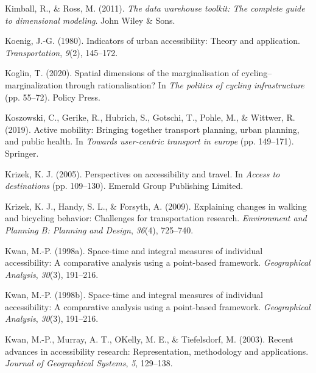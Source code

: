 \documentclass[
11pt, %
oneside, %
english, %
singlespacing, %
]{macthesis} %
\newlength{\cslhangindent}
\newenvironment{CSLReferences}[2] %
 {%
  \setlength{\parindent}{0pt}
  \ifodd #1 \everypar{\setlength{\hangindent}{\cslhangindent}}\ignorespaces\fi
  \ifnum #2 > 0
  \setlength{\parskip}{#2\baselineskip}
  \fi
 }%
 {}
\begin{document}
\begin{CSLReferences}{1}{0}
\leavevmode{}%
Kimball, R., \& Ross, M. (2011). \emph{The data warehouse toolkit: The complete guide to dimensional modeling}. John Wiley \& Sons.

\leavevmode{}%
Koenig, J.-G. (1980). Indicators of urban accessibility: Theory and application. \emph{Transportation}, \emph{9}(2), 145--172.

\leavevmode{}%
Koglin, T. (2020). Spatial dimensions of the marginalisation of cycling--marginalization through rationalisation? In \emph{The politics of cycling infrastructure} (pp. 55--72). Policy Press.

\leavevmode{}%
Koszowski, C., Gerike, R., Hubrich, S., Gotschi, T., Pohle, M., \& Wittwer, R. (2019). Active mobility: Bringing together transport planning, urban planning, and public health. In \emph{Towards user-centric transport in europe} (pp. 149--171). Springer.

\leavevmode{}%
Krizek, K. J. (2005). Perspectives on accessibility and travel. In \emph{Access to destinations} (pp. 109--130). Emerald Group Publishing Limited.

\leavevmode{}%
Krizek, K. J., Handy, S. L., \& Forsyth, A. (2009). Explaining changes in walking and bicycling behavior: Challenges for transportation research. \emph{Environment and Planning B: Planning and Design}, \emph{36}(4), 725--740.

\leavevmode{}%
Kwan, M.-P. (1998a). Space-time and integral measures of individual accessibility: A comparative analysis using a point-based framework. \emph{Geographical Analysis}, \emph{30}(3), 191--216.

\leavevmode{}%
Kwan, M.-P. (1998b). Space-time and integral measures of individual accessibility: A comparative analysis using a point-based framework. \emph{Geographical Analysis}, \emph{30}(3), 191--216.

\leavevmode{}%
Kwan, M.-P., Murray, A. T., OKelly, M. E., \& Tiefelsdorf, M. (2003). Recent advances in accessibility research: Representation, methodology and applications. \emph{Journal of Geographical Systems}, \emph{5}, 129--138.


\end{CSLReferences}
\end{document}
